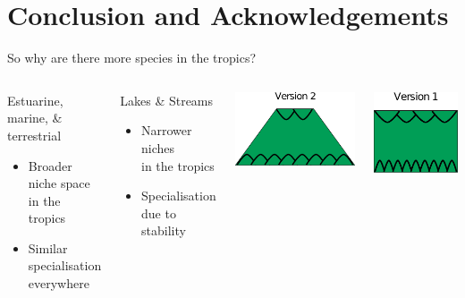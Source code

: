 \documentclass{beamer}
\begin{document}
\section*{Conclusion and Acknowledgements}
  \begin{frame}{So why are there more species in the tropics?}
    \begin{columns}
    \column{.5in}
    \column{2.5in}
      \begin{block}{Estuarine, marine, \& terrestrial}
        \begin{itemize}
          \item Broader niche space\\ in the tropics
          \item Similar specialisation\\ everywhere
        \end{itemize}
      \end{block}

    \vspace{.5cm}

    \begin{block}{Lakes \& Streams}
      \begin{itemize}
        \item Narrower niches\\ in the tropics
        \item Specialisation\\ due to stability
      \end{itemize}
    \end{block}

      \column{1.5in}
        \centering
        \includegraphics[height=.75in]{Figures/version2.eps}

    \vspace{1cm}

        \includegraphics[height=.75in]{Figures/version1.eps}
    \column{.5in}
    \end{columns}

  \end{frame}
\end{document}
